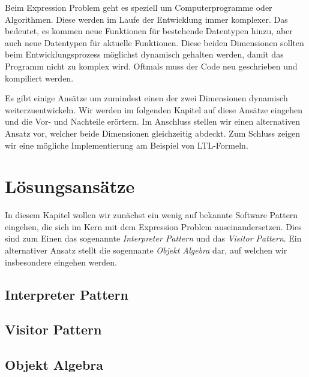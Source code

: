 \documentclass{llncs}
\begin{document}
Beim Expression Problem geht es speziell um Computerprogramme oder Algorithmen. Diese werden im Laufe der Entwicklung immer komplexer. Das bedeutet, es kommen neue Funktionen für bestehende Datentypen hinzu, aber auch neue Datentypen für aktuelle Funktionen. Diese beiden Dimensionen sollten beim Entwicklungsprozess möglichst dynamisch gehalten werden, damit das Programm nicht zu komplex wird. Oftmals muss der Code neu geschrieben und kompiliert werden. 

Es gibt einige Ansätze um zumindest einen der zwei Dimensionen dynamisch weiterzuentwickeln. Wir werden im folgenden Kapitel auf diese Ansätze eingehen und die Vor- und Nachteile erörtern. Im Anschluss stellen wir einen alternativen Ansatz vor, welcher beide Dimensionen gleichzeitig abdeckt. Zum Schluss zeigen wir eine mögliche Implementierung am Beispiel von LTL-Formeln.   

\section{Lösungsansätze} \label{sec:approaches}

In diesem Kapitel wollen wir zunächst ein wenig auf bekannte Software Pattern eingehen, die sich im Kern mit dem Expression Problem auseinandersetzen. Dies sind zum Einen das sogenannte \emph{Interpreter Pattern} und das \emph{Visitor Pattern}. Ein alternativer Ansatz stellt die sogennante \emph{Objekt Algebra} dar, auf welchen wir insbesondere eingehen werden. 

\subsection{Interpreter Pattern} \label{ssec:interpreter}

\subsection{Visitor Pattern} \label{ssec:visitor}

\subsection{Objekt Algebra} \label{ssec:oa}
\end{document}
